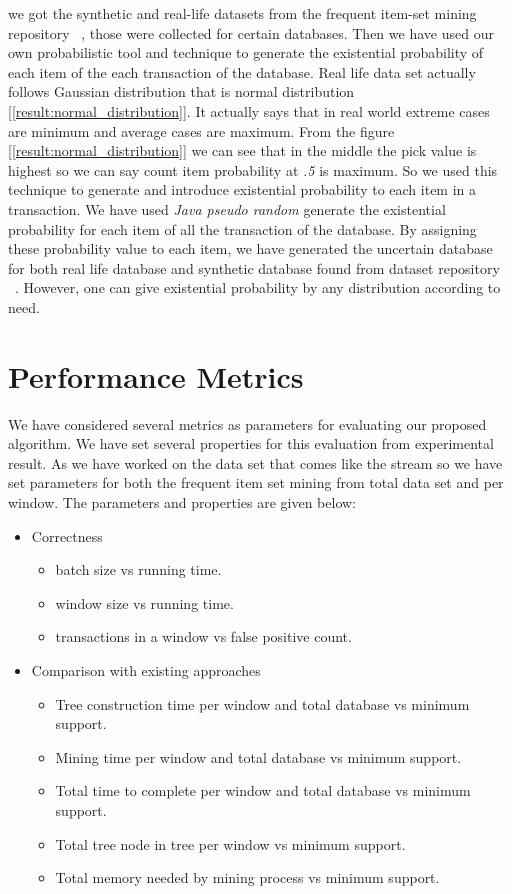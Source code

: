 
we got the synthetic and real-life datasets from the frequent item-set mining repository ~\cite{dataset}, those were collected for certain databases. Then we have used our own probabilistic tool and technique to generate the existential probability of each item of the each transaction of the database. Real life data set actually follows Gaussian distribution that is normal distribution [\ref{result:normal_distribution}]. It actually says that in real world extreme cases are minimum and average cases are maximum. From the figure [\ref{result:normal_distribution}] we can see that in the middle the pick value is highest so we can say count item probability at \emph{.5} is maximum. So we used this technique to generate and introduce existential probability to each item in a transaction. We have used \emph{Java pseudo random} generate the existential probability for each item of all the transaction of the database. By assigning these probability value to each item, we have generated the uncertain database for both real life database and synthetic database found from dataset repository ~\cite{dataset}. However, one can give existential probability by any distribution according to need.


\section{Performance Metrics}
We have considered several metrics as parameters for evaluating our proposed algorithm. We have set several properties for this evaluation from experimental result. As we have worked on the data set that comes like the stream so we have set parameters for both the frequent item set mining from total data set and per window. The parameters and properties are given below:

\begin{itemize}
    \item {Correctness}
    \begin{itemize}
        \item batch size vs running time.
        \item window size vs running time.
        \item transactions in a window vs false positive count.
    \end{itemize}
    \item {Comparison with existing approaches}
    \begin{itemize}
        \item Tree construction time per window and total database vs minimum support.
        \item Mining time per window and total database vs minimum support.
        \item Total time to complete per window and total database vs minimum support.
        \item Total tree node in tree per window vs minimum support.
        \item Total memory needed by mining process vs minimum support.
    \end{itemize}
\end{itemize}
